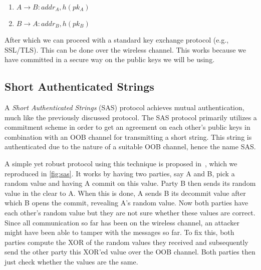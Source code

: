 \documentclass[conference, 12pt]{sty/IEEEtran}
\newlength{\arrow}
\begin{document}
\begin{enumerate}
    \item $A \rightarrow B: addr_A, h(pk_A)$
    \item $B \rightarrow A: addr_B, h(pk_B)$
\end{enumerate}

After which we can proceed with a standard key exchange protocol (e.g., SSL/TLS).
This can be done over the wireless channel.
This works because we have committed in a secure way on the public keys we will be using.

\subsection{Short Authenticated Strings}
\label{ssec:short_authenticated_strings}

A \emph{Short Authenticated Strings} (SAS) protocol achieves mutual authentication, much like the previously discussed protocol.
The SAS protocol primarily utilizes a commitment scheme in order to get an agreement on each other's public keys in combination with an OOB channel for transmitting a short string.
This string is authenticated due to the nature of a suitable OOB channel, hence the name SAS.

A simple yet robust protocol using this technique is proposed in~\cite{pasini2006sas}, which we reproduced in \autoref{fig:sas}.
It works by having two parties, say A and B, pick a random value and having A commit on this value.
Party B then sends its random value in the clear to A.
When this is done, A sends B its decommit value after which B opens the commit, revealing A's random value.
Now both parties have each other's random value but they are not sure whether these values are correct.
Since all communication so far has been on the wireless channel, an attacker might have been able to tamper with the messages so far.
To fix this, both parties compute the XOR of the random values they received and subsequently send the other party this XOR'ed value over the OOB channel.
Both parties then just check whether the values are the same.
\end{document}
